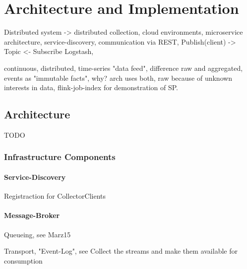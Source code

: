 \chapter{Architecture and Implementation}

Distributed system -> distributed collection, cloud environments, microservice architecture,
service-discovery, communication via REST, Publish(client) -> Topic <- Subscribe Logstash,

continuous, distributed, time-series "data feed", difference raw and aggregated\cite{Klepp16},
events as "immutable facts", why?
arch uses both, raw because of unknown interests in data, flink-job-index for demonstration
of SP.

%
%
%
%
\section{Architecture}

TODO

\subsection{Infrastructure Components}

\subsubsection{Service-Discovery}

Registraction for CollectorClients

\subsubsection{Message-Broker}
Queueing, see Marz15

Transport, "Event-Log", see \cite{Kreps13}
Collect the streams and make them available for consumption

